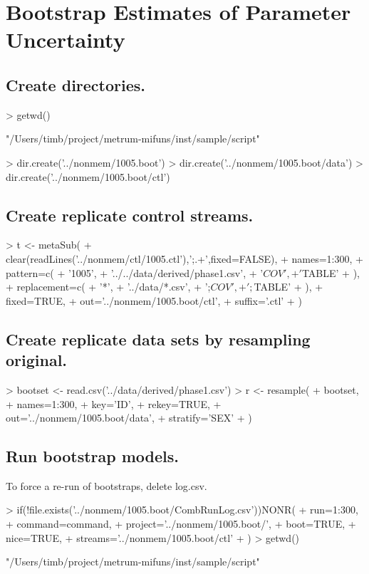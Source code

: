 \section{Bootstrap Estimates of Parameter Uncertainty}
\subsection{Create directories.}
\begin{Schunk}
\begin{Sinput}
> getwd()
\end{Sinput}
\begin{Soutput}
[1] "/Users/timb/project/metrum-mifuns/inst/sample/script"
\end{Soutput}
\begin{Sinput}
> dir.create('../nonmem/1005.boot')
> dir.create('../nonmem/1005.boot/data')
> dir.create('../nonmem/1005.boot/ctl')
\end{Sinput}
\end{Schunk}
\subsection{Create replicate control streams.}
\begin{Schunk}
\begin{Sinput}
> t <- metaSub(
+      clear(readLines('../nonmem/ctl/1005.ctl'),';.+',fixed=FALSE),
+      names=1:300,
+      pattern=c(
+          '1005',
+          '../../data/derived/phase1.csv',
+          '$COV',
+          '$TABLE'
+      ),
+      replacement=c(
+          '*',
+          '../data/*.csv',
+          ';$COV',
+          ';$TABLE'
+     ),
+     fixed=TRUE,
+     out='../nonmem/1005.boot/ctl',
+     suffix='.ctl'
+  )
\end{Sinput}
\end{Schunk}
\subsection{Create replicate data sets by resampling original.}
\begin{Schunk}
\begin{Sinput}
>  bootset <- read.csv('../data/derived/phase1.csv')
>  r <- resample(
+  	bootset,
+  	names=1:300,
+  	key='ID',
+  	rekey=TRUE,
+  	out='../nonmem/1005.boot/data',
+  	stratify='SEX'
+  )
\end{Sinput}
\end{Schunk}
\subsection{Run bootstrap models.}
To force a re-run of bootstraps, delete log.csv.
\begin{Schunk}
\begin{Sinput}
> if(!file.exists('../nonmem/1005.boot/CombRunLog.csv'))NONR(
+      run=1:300,
+      command=command,
+      project='../nonmem/1005.boot/',
+      boot=TRUE,
+      nice=TRUE,
+      streams='../nonmem/1005.boot/ctl'
+ )
> getwd()  
\end{Sinput}
\begin{Soutput}
[1] "/Users/timb/project/metrum-mifuns/inst/sample/script"
\end{Soutput}
\end{Schunk}
